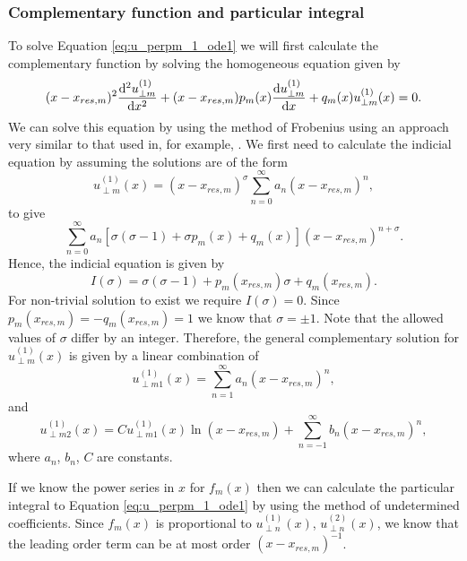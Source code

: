 \subsubsection{Complementary function and particular integral}

To solve Equation \eqref{eq:u_perpm_1_ode1} we will first calculate the complementary function by solving the homogeneous equation given by
\begin{equation}
    \label{eq:u_perpm_1_ode_homogenous}
    (x-x_{res,m})^2\dv[2]{u_{\perp m}^{(1)}}{x}+(x-x_{res,m})p_m(x)\dv{u_{\perp m}^{(1)}}{x}+q_m(x)u_{\perp m}^{(1)}(x) = 0.
\end{equation}
We can solve this equation by using the method of Frobenius using an approach very similar to that used in, for example, \citet{Thompson1993,Wright1995,Soler2013}. We first need to calculate the indicial equation by assuming the solutions are of the form
\[u_{\perp m}^{(1)}(x) = (x-x_{res,m})^\sigma\sum_{n=0}^\infty a_n(x-x_{res,m})^n,\]
to give
\[\sum_{n=0}^\infty a_n[\sigma(\sigma-1)+\sigma p_m(x) + q_m(x)](x-x_{res,m})^{n+\sigma}.\]
Hence, the indicial equation is given by
\begin{equation}
    I(\sigma) = \sigma(\sigma-1) + p_m(x_{res,m})\sigma + q_m(x_{res,m}).
\end{equation}
For non-trivial solution to exist we require $I(\sigma)=0$. Since $p_m(x_{res,m})=-q_m(x_{res,m})=1$ we know that $\sigma =\pm1$. Note that the allowed values of $\sigma$ differ by an integer. Therefore, the general complementary solution for $u_{\perp m}^{(1)}(x)$ is given by a linear combination of
\begin{equation}
    u_{\perp m 1}^{(1)}(x) = \sum_{n=1}^\infty a_n (x-x_{res,m})^n,
\end{equation}
and
\begin{equation}
    u_{\perp m 2}^{(1)}(x) = Cu_{\perp m 1}^{(1)}(x) \ln(x-x_{res,m})+ \sum_{n=-1}^\infty b_n(x-x_{res,m})^n,
\end{equation}
where $a_n$, $b_n$, $C$ are constants.

If we know the power series in $x$ for $f_m(x)$ then we can calculate the particular integral to Equation \eqref{eq:u_perpm_1_ode1} by using the method of undetermined coefficients. Since $f_m(x)$ is proportional to $u_{\perp n}^{(1)}(x)$, $u_{\perp n}^{(2)}(x)$, we know that the leading order term can be at most order $(x-x_{res,m})^{-1}$.


